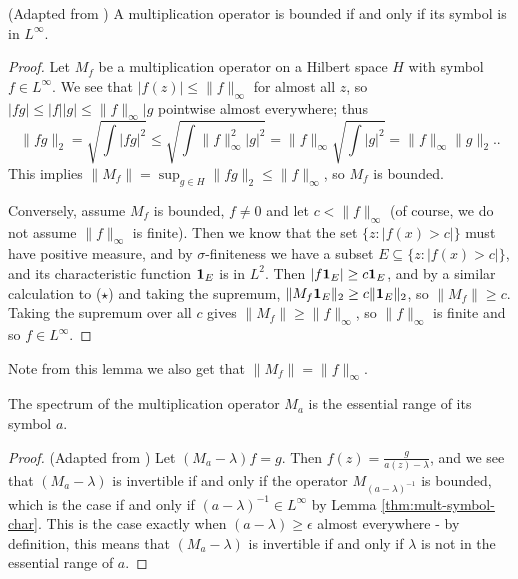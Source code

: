 \documentclass[../main.tex]{subfiles}
\begin{document}
\begin{lemma}\label{thm:mult-symbol-char}
(Adapted from \cite{arveson2002short})
A multiplication operator is bounded if and only if its symbol is in $L^\infty$.
\end{lemma}
\begin{proof}
Let $M_f$ be a multiplication operator on a Hilbert space $H$ with symbol $f \in L^\infty$. We see that $|f(z)| \leq \|f\|_\infty$ for almost all $z$, so $|f g| \leq |f||g| \leq \|f\|_\infty |g$ pointwise almost everywhere; thus
\begin{equation*}
\|f g\|_2 = \sqrt{\int |f g|^2} \leq \sqrt{\int \|f\|_\infty^2|g|^2} = \|f\|_\infty \sqrt{\int |g|^2} = \|f\|_\infty \|g\|_2. .\tag{$\star$}
\end{equation*}
This implies $\|M_f\| = \sup_{g \in H} \|f g\|_2 \leq \|f\|_\infty$, so $M_f$ is bounded.

Conversely, assume $M_f$ is bounded, $f \neq 0$ and let $c < \|f\|_\infty$ (of course, we do not assume $\|f\|_\infty$ is finite). Then we know that the
set $\{z : |f(x) > c|\}$ must have positive measure, and by $\sigma$-finiteness we have a subset $E \subseteq \{z : |f(x) > c|\}$, and its characteristic 
function $\mathbf{1}_E$ is in $L^2$. Then $|f \mathbf{1}_E| \geq c \mathbf{1}_E$, and by a similar calculation to ($\star$) and taking the supremum, $\|M_f  \mathbf{1}_E\|_2 \geq c \|\mathbf{1}_E\|_2$, so $\|M_f\| \geq c$. Taking the supremum over all $c$ gives $\|M_f\| \geq \|f\|_\infty$, so $\|f\|_\infty$ is finite and so $f \in L^\infty$.
\end{proof}

Note from this lemma we also get that $\|M_f\| = \|f\|_\infty$.

\begin{theorem}\label{thm:mult-op-spec}
  The spectrum of the multiplication operator $M_a$ is the essential range of its symbol $a$.
\end{theorem}
\begin{proof}
(Adapted from \cite{garcia2023operator})
Let $(M_a - \lambda)f = g$. Then $f(z) = \frac{g}{a(z) - \lambda}$, and we see that $(M_a - \lambda)$ is invertible if and only if the operator
$M_{(a - \lambda)^{-1}}$ is bounded, which is the case if and only if $(a - \lambda)^{-1} \in L^\infty$ by Lemma \ref{thm:mult-symbol-char}.
This is the case exactly when $(a - \lambda) \geq \epsilon$ almost everywhere - by definition, this means that $(M_a - \lambda)$ is invertible if and
only if $\lambda$ is not in the essential range of $a$.
\end{proof}
\end{document}

